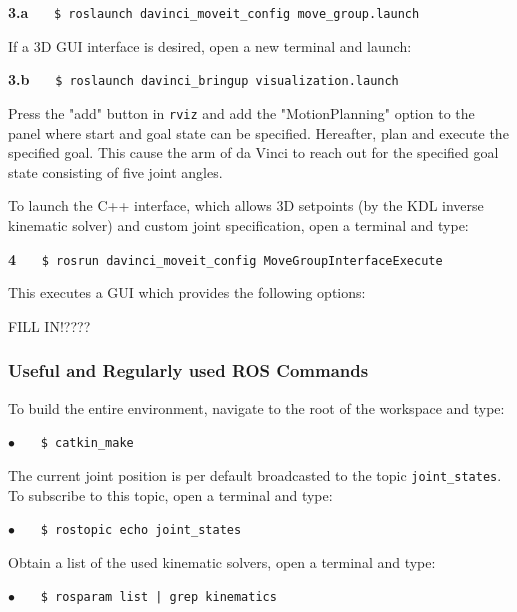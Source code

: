 \hspace{1cm} \textbf{3.a} \ \ \  \texttt{\$ roslaunch davinci\_moveit\_config move\_group.launch} \ \ \ {} 

If a 3D GUI interface is desired, open a new terminal and launch:

\hspace{1cm} \textbf{3.b} \ \ \  \texttt{\$ roslaunch davinci\_bringup visualization.launch} \ \ \ {} 

Press the "add" button in \texttt{rviz} and add the "MotionPlanning" option to the panel where start and goal state can be specified. Hereafter, plan and execute the specified goal. This cause the arm of da Vinci to reach out for the specified goal state consisting of five joint angles.

To launch the C++ interface, which allows 3D setpoints (by the KDL inverse kinematic solver) and custom joint specification, open a terminal and type:

\hspace{1cm} \textbf{4} \ \ \  \texttt{\$ rosrun davinci\_moveit\_config MoveGroupInterfaceExecute} \ \ \ {\color{RoyalBlue}{\textit{}}} 

This executes a GUI which provides the following options:

FILL IN!????

\subsubsection*{Useful and Regularly used ROS Commands}
To build the entire environment, navigate to the root of the workspace and type:

\hspace{1cm} \textbf{$\bullet$} \ \ \  \texttt{\$ catkin\_make}%

The current joint position is per default broadcasted to the topic \texttt{joint\_states}. To subscribe to this topic, open a terminal and type:

\hspace{1cm} \textbf{$\bullet$} \ \ \  \texttt{\$ rostopic echo joint\_states} \ \ \ {} 

Obtain a list of the used kinematic solvers, open a terminal and type:

\hspace{1cm} \textbf{$\bullet$} \ \ \  \texttt{\$ rosparam list | grep kinematics} \ \ \ {} 

